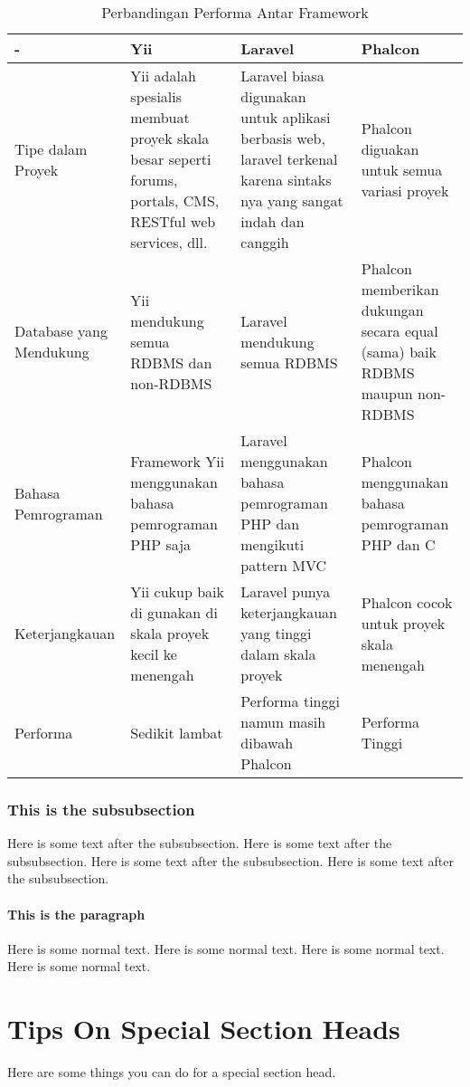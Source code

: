\begin{table}[ht]
\caption{Perbandingan Performa Antar Framework}
\centering
\begin{tabular}{p{1.25in}p{1.25in}p{1.25in}p{1.25in}}
\hline
-&Yii&Laravel&Phalcon\\
\hline
Tipe dalam Proyek&Yii adalah spesialis membuat proyek skala besar seperti forums, portals, CMS, RESTful web services, dll.&Laravel biasa digunakan untuk aplikasi berbasis web, laravel terkenal karena sintaks nya yang sangat indah dan canggih&Phalcon diguakan untuk semua variasi proyek\\
\hline
Database yang Mendukung&Yii mendukung semua RDBMS dan non-RDBMS&Laravel mendukung semua RDBMS&Phalcon memberikan dukungan secara equal (sama) baik RDBMS maupun non-RDBMS\\
\hline
Bahasa Pemrograman&Framework Yii menggunakan bahasa pemrograman PHP saja&Laravel menggunakan bahasa pemrograman PHP dan mengikuti pattern MVC&Phalcon menggunakan bahasa pemrograman PHP dan C\\
\hline
Keterjangkauan&Yii cukup baik di gunakan di skala proyek kecil ke menengah&Laravel punya keterjangkauan yang tinggi dalam skala proyek&Phalcon cocok untuk proyek skala menengah\\
\hline
Performa&Sedikit lambat&Performa tinggi namun masih dibawah Phalcon&Performa Tinggi\\
\hline
\end{tabular}
\label{table:Perbandingan Performa}
\end{table}


\subsubsection{This is the subsubsection}
Here is some text after the subsubsection.
Here is some text after the subsubsection.
Here is some text after the subsubsection.
Here is some text after the subsubsection.

\paragraph{This is the paragraph}
Here is some normal text.
Here is some normal text.
Here is some normal text.
Here is some normal text.

\section{Tips On Special Section Heads}
Here are some things you can do for a special
section head.

